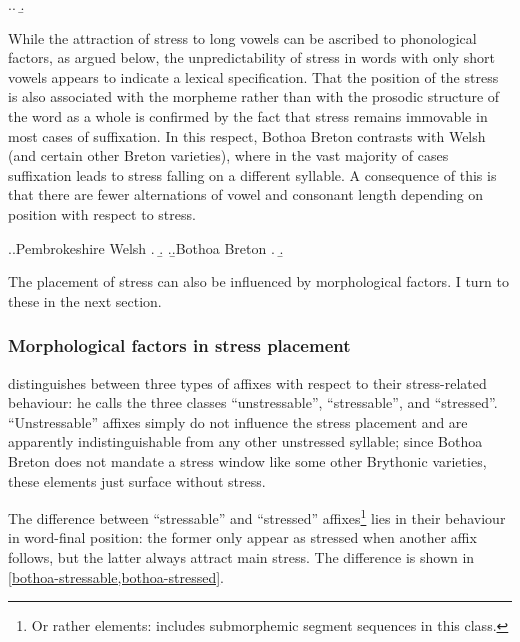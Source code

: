 \ex.\a.
\b.


While the attraction of stress to long vowels can be ascribed to phonological factors, as argued below, the unpredictability of stress in words with only short vowels appears to indicate a lexical specification. That the position of the stress is also associated with the morpheme rather than with the prosodic structure of the word as a whole is confirmed by the fact that stress remains immovable in most cases of suffixation. In this respect, Bothoa Breton contrasts with Welsh (and certain other Breton varieties), where in the vast majority of cases suffixation leads to stress falling on a different syllable. A consequence of this is that there are fewer alternations of vowel and consonant length depending on position with respect to stress.

\ex.\a.Pembrokeshire Welsh
\a.
\b.
\z.\b.Bothoa Breton
\a.
\b.

The placement of stress can also be influenced by morphological factors. I turn to these in the next section.

\subsubsection{Morphological factors in stress placement}
\label{sec:morph-fact-stress}

\citet{humphreys95:_phonol_bothoa_saint_nicol_pelem} distinguishes between three types of affixes with respect to their stress-related behaviour: he calls the three classes \enquote{unstressable}, \enquote{stressable}, and \enquote{stressed}. \enquote{Unstressable} affixes simply do not influence the stress placement and are apparently indistinguishable from any other unstressed syllable; since Bothoa Breton does not mandate a stress window like some other Brythonic varieties, these elements just surface without stress.

The difference between \enquote{stressable} and \enquote{stressed} affixes\footnote{Or rather elements: \citet{humphreys95:_phonol_bothoa_saint_nicol_pelem} includes submorphemic segment sequences in this class.} lies in their behaviour in word-final position: the former only appear as stressed when another affix follows, but the latter always attract main stress. The difference is shown in \cref{bothoa-stressable,bothoa-stressed}.

